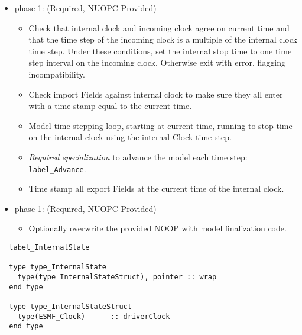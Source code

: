 \begin{itemize}
\item phase 1: ({\sc Required, NUOPC Provided})
  \begin{itemize}
  \item Check that internal clock and incoming clock agree on current time and that the time step of the incoming clock is a multiple of the internal clock time step. Under these conditions, set the internal stop time to one time step interval on the incoming clock. Otherwise exit with error, flagging incompatibility.
  \item Check import Fields against internal clock to make sure they all enter with a time stamp equal to the current time.
  \item Model time stepping loop, starting at current time, running to stop time on the internal clock using the internal Clock time step.
  \item {\it Required specialization} to advance the model each time step: {\tt label\_Advance}.
  \item Time stamp all export Fields at the current time of the internal clock.
  \end{itemize}    
\end{itemize}

\begin{itemize}
\item phase 1: ({\sc Required, NUOPC Provided})
  \begin{itemize}
  \item Optionally overwrite the provided NOOP with model finalization code.
  \end{itemize}      
\end{itemize}

\begin{verbatim}  label_InternalState

  type type_InternalState
    type(type_InternalStateStruct), pointer :: wrap
  end type

  type type_InternalStateStruct
    type(ESMF_Clock)      :: driverClock
  end type

\end{verbatim}

